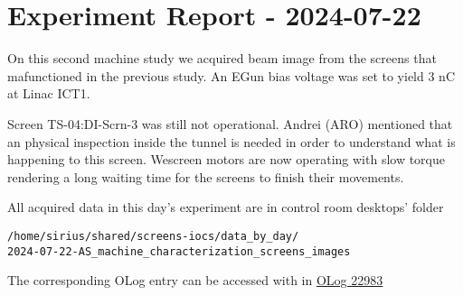 \documentclass{article}
\begin{document}
\section{Experiment Report - 2024-07-22}

On this second machine study we acquired beam image from the screens that mafunctioned in the previous study. An EGun bias voltage was set to yield 3 nC at Linac ICT1. 

Screen TS-04:DI-Scrn-3 was still not operational. Andrei (ARO) mentioned that an physical inspection inside the tunnel is needed in order to understand what is happening to this screen. Wescreen motors are now operating with slow torque rendering a long waiting time for the screens to finish their movements.



All acquired data in this day's experiment are in control room desktops' folder 
\begin{verbatim}
/home/sirius/shared/screens-iocs/data_by_day/
2024-07-22-AS_machine_characterization_screens_images
\end{verbatim}
The corresponding OLog entry can be accessed with in \href{https://ais-eng-srv-ta.cnpem.br/Olog/index.html?reason=not_logged_in#22983_2}{OLog 22983}
\end{document}
